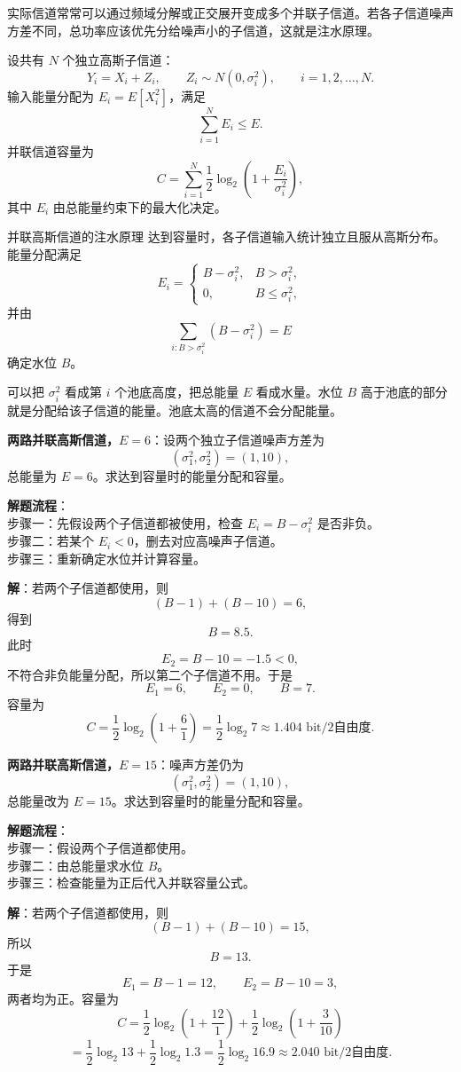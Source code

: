 实际信道常常可以通过频域分解或正交展开变成多个并联子信道。若各子信道噪声方差不同，总功率应该优先分给噪声小的子信道，这就是注水原理。

设共有 $N$ 个独立高斯子信道：
\[
Y_i=X_i+Z_i,
\qquad
Z_i\sim N(0,\sigma_i^2),
\qquad i=1,2,\dots,N.
\]
输入能量分配为 $E_i=E[X_i^2]$，满足
\[
\sum_{i=1}^{N}E_i\le E.
\]
并联信道容量为
\[
C=\sum_{i=1}^{N}\frac12\log_2\left(1+\frac{E_i}{\sigma_i^2}\right),
\]
其中 $E_i$ 由总能量约束下的最大化决定。

\begin{theoremBox}{并联高斯信道的注水原理}
达到容量时，各子信道输入统计独立且服从高斯分布。能量分配满足
\[
E_i=\begin{cases}
B-\sigma_i^2, & B>\sigma_i^2,\\
0, & B\le\sigma_i^2,
\end{cases}
\]
并由
\[
\sum_{i:B>\sigma_i^2}(B-\sigma_i^2)=E
\]
确定水位 $B$。
\end{theoremBox}

可以把 $\sigma_i^2$ 看成第 $i$ 个池底高度，把总能量 $E$ 看成水量。水位 $B$ 高于池底的部分就是分配给该子信道的能量。池底太高的信道不会分配能量。

\begin{example}
\label{ex:ch8-two-parallel-gaussian-e6}
\textbf{两路并联高斯信道，$E=6$}：设两个独立子信道噪声方差为
\[
(\sigma_1^2,\sigma_2^2)=(1,10),
\]
总能量为 $E=6$。求达到容量时的能量分配和容量。

\noindent \textbf{解题流程}：\\[2pt]
步骤一：先假设两个子信道都被使用，检查 $E_i=B-\sigma_i^2$ 是否非负。\\
步骤二：若某个 $E_i<0$，删去对应高噪声子信道。\\
步骤三：重新确定水位并计算容量。

\textbf{解}：若两个子信道都使用，则
\[
(B-1)+(B-10)=6,
\]
得到
\[
B=8.5.
\]
此时
\[
E_2=B-10=-1.5<0,
\]
不符合非负能量分配，所以第二个子信道不用。于是
\[
E_1=6,
\qquad
E_2=0,
\qquad
B=7.
\]
容量为
\[
C=\frac12\log_2\left(1+\frac61\right)
=\frac12\log_2 7
\approx1.404\text{ bit/2自由度}.
\]
\end{example}

\begin{example}
\label{ex:ch8-two-parallel-gaussian-e15}
\textbf{两路并联高斯信道，$E=15$}：噪声方差仍为
\[
(\sigma_1^2,\sigma_2^2)=(1,10),
\]
总能量改为 $E=15$。求达到容量时的能量分配和容量。

\noindent \textbf{解题流程}：\\[2pt]
步骤一：假设两个子信道都使用。\\
步骤二：由总能量求水位 $B$。\\
步骤三：检查能量为正后代入并联容量公式。

\textbf{解}：若两个子信道都使用，则
\[
(B-1)+(B-10)=15,
\]
所以
\[
B=13.
\]
于是
\[
E_1=B-1=12,
\qquad
E_2=B-10=3,
\]
两者均为正。容量为
\[
C=\frac12\log_2\left(1+\frac{12}{1}\right)
+\frac12\log_2\left(1+\frac{3}{10}\right)
\]
\[
=\frac12\log_2 13+\frac12\log_2 1.3
=\frac12\log_2 16.9
\approx2.040\text{ bit/2自由度}.
\]
\end{example}

